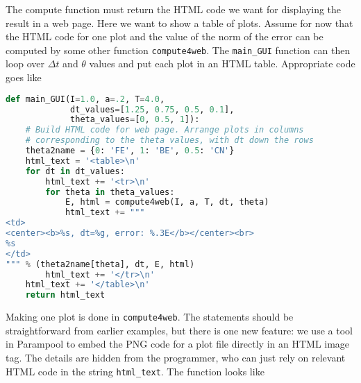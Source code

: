 \documentclass[graybox,sectrefs,envcountresetchap,open=right,final]{svmonodo}
\begin{document}
The compute function must return the HTML code we want for displaying
the result in a web page. Here we want to show a
table of plots.
Assume for now that the HTML code for one plot and the value of the
norm of the error can be computed by some other function \texttt{compute4web}.
The \Verb!main_GUI! function can then loop over $\Delta t$ and $\theta$
values and put each plot in an HTML table. Appropriate code goes like






















\begin{lstlisting}[language=python,style=blue1_bluegreen]
def main_GUI(I=1.0, a=.2, T=4.0,
             dt_values=[1.25, 0.75, 0.5, 0.1],
             theta_values=[0, 0.5, 1]):
    # Build HTML code for web page. Arrange plots in columns
    # corresponding to the theta values, with dt down the rows
    theta2name = {0: 'FE', 1: 'BE', 0.5: 'CN'}
    html_text = '<table>\n'
    for dt in dt_values:
        html_text += '<tr>\n'
        for theta in theta_values:
            E, html = compute4web(I, a, T, dt, theta)
            html_text += """
<td>
<center><b>%s, dt=%g, error: %.3E</b></center><br>
%s
</td>
""" % (theta2name[theta], dt, E, html)
        html_text += '</tr>\n'
    html_text += '</table>\n'
    return html_text

\end{lstlisting}


Making one plot is done in \texttt{compute4web}. The statements should be
straightforward from earlier examples, but there is one new feature:
we use a tool in Parampool to embed the PNG code for a plot file
directly in an HTML image tag. The details are hidden from the
programmer, who can just rely on
relevant HTML code in the string \Verb!html_text!. The function looks like
\end{document}
